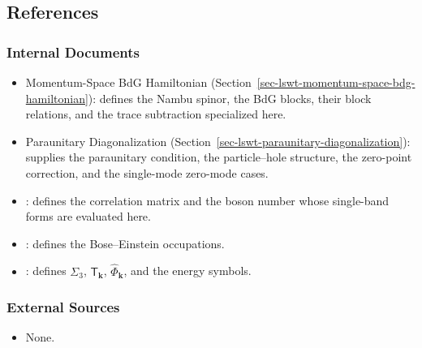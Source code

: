 \subsection{References}

\subsubsection{Internal Documents}

\begin{itemize}
\tightlist
\item
  Momentum-Space BdG Hamiltonian (Section~\ref{sec-lswt-momentum-space-bdg-hamiltonian}): defines the Nambu spinor, the BdG blocks, their block relations, and the trace subtraction specialized here.
\item
  Paraunitary Diagonalization (Section~\ref{sec-lswt-paraunitary-diagonalization}): supplies the paraunitary condition, the particle--hole structure, the zero-point correction, and the single-mode zero-mode cases.
\item
  : defines the correlation matrix and the boson number whose single-band forms are evaluated here.
\item
  : defines the Bose--Einstein occupations.
\item
  : defines \(\Sigma_3\), \(\mathsf T_{\mathbf k}\), \(\hat\Phi_{\mathbf k}\), and the energy symbols.
\end{itemize}

\subsubsection{External Sources}

\begin{itemize}
\tightlist
\item
  None.
\end{itemize}
